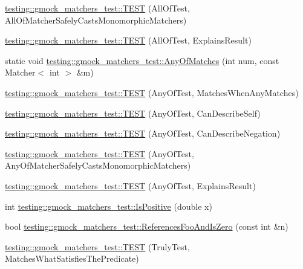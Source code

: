 \begin{DoxyCompactItemize}
\item 
\mbox{\hyperlink{namespacetesting_1_1gmock__matchers__test_a4196a4000390e2378954d55b4f6d2893}{testing\+::gmock\+\_\+matchers\+\_\+test\+::\+T\+E\+ST}} (All\+Of\+Test, All\+Of\+Matcher\+Safely\+Casts\+Monomorphic\+Matchers)
\item 
\mbox{\hyperlink{namespacetesting_1_1gmock__matchers__test_a2b9f4a791dd4f1fb9f8a1400883a5db4}{testing\+::gmock\+\_\+matchers\+\_\+test\+::\+T\+E\+ST}} (All\+Of\+Test, Explains\+Result)
\item 
static void \mbox{\hyperlink{namespacetesting_1_1gmock__matchers__test_a0765400728b9d42a07b720f3566f0b4c}{testing\+::gmock\+\_\+matchers\+\_\+test\+::\+Any\+Of\+Matches}} (int num, const Matcher$<$ int $>$ \&m)
\item 
\mbox{\hyperlink{namespacetesting_1_1gmock__matchers__test_a4949d40a1ac77182274189c21848af00}{testing\+::gmock\+\_\+matchers\+\_\+test\+::\+T\+E\+ST}} (Any\+Of\+Test, Matches\+When\+Any\+Matches)
\item 
\mbox{\hyperlink{namespacetesting_1_1gmock__matchers__test_a00bd490bf974b3f3485a1b0fde9fa490}{testing\+::gmock\+\_\+matchers\+\_\+test\+::\+T\+E\+ST}} (Any\+Of\+Test, Can\+Describe\+Self)
\item 
\mbox{\hyperlink{namespacetesting_1_1gmock__matchers__test_acc5e849e0765f00a48581e9480f3c8e2}{testing\+::gmock\+\_\+matchers\+\_\+test\+::\+T\+E\+ST}} (Any\+Of\+Test, Can\+Describe\+Negation)
\item 
\mbox{\hyperlink{namespacetesting_1_1gmock__matchers__test_a8fb1598253450afeb0440682cd23999e}{testing\+::gmock\+\_\+matchers\+\_\+test\+::\+T\+E\+ST}} (Any\+Of\+Test, Any\+Of\+Matcher\+Safely\+Casts\+Monomorphic\+Matchers)
\item 
\mbox{\hyperlink{namespacetesting_1_1gmock__matchers__test_ad4c09014fce6029575e2c337cde85bdf}{testing\+::gmock\+\_\+matchers\+\_\+test\+::\+T\+E\+ST}} (Any\+Of\+Test, Explains\+Result)
\item 
int \mbox{\hyperlink{namespacetesting_1_1gmock__matchers__test_a70e728cf67d0224c3ebb9eb8959cc39d}{testing\+::gmock\+\_\+matchers\+\_\+test\+::\+Is\+Positive}} (double x)
\item 
bool \mbox{\hyperlink{namespacetesting_1_1gmock__matchers__test_abdce9daf2e3d3721d68f76680129f03b}{testing\+::gmock\+\_\+matchers\+\_\+test\+::\+References\+Foo\+And\+Is\+Zero}} (const int \&n)
\item 
\mbox{\hyperlink{namespacetesting_1_1gmock__matchers__test_ab7761562a8ffea67a485f3f649f6430a}{testing\+::gmock\+\_\+matchers\+\_\+test\+::\+T\+E\+ST}} (Truly\+Test, Matches\+What\+Satisfies\+The\+Predicate)

\end{DoxyCompactItemize}
